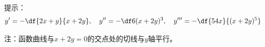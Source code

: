 
提示：
$$y'=-\df{2x+y}{x+2y},\quad y''=-\df6{(x+2y)^3},\quad
y'''=-\df{54x}{(x+2y)^5}$$

注：函数曲线与$x+2y=0$的交点处的切线与$y$轴平行。

